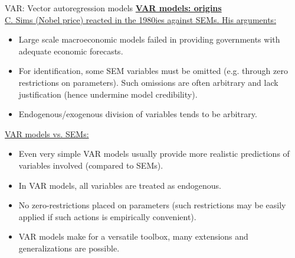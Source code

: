 \documentclass[usenames,dvipsnames]{beamer}
\begin{document}
\begin{frame}{VAR: Vector autoregression models}
\footnotesize
\underline{\textbf{VAR models: origins}} \\
\medskip
\underline{C. Sims (Nobel price) reacted in the 1980ies against SEMs. His arguments:}\\
\begin{itemize}
\item Large scale macroeconomic models failed in providing governments with adequate economic forecasts.
\item For identification, some SEM variables must be omitted (e.g. through zero restrictions on parameters). Such omissions are often arbitrary and lack justification (hence undermine model credibility).
\item Endogenous/exogenous division of variables tends to be arbitrary. 
\end{itemize}
\underline{VAR models vs. SEMs:}\\
\begin{itemize}
\item Even very simple VAR models usually provide more realistic predictions of variables involved (compared to SEMs).
\item In VAR models, all variables are treated as endogenous.
\item No zero-restrictions placed on parameters (such restrictions may be easily applied if such actions is empirically convenient). 
\item VAR models make for a versatile toolbox, many extensions and generalizations are possible.
\end{itemize}
\end{frame}
\end{document}
